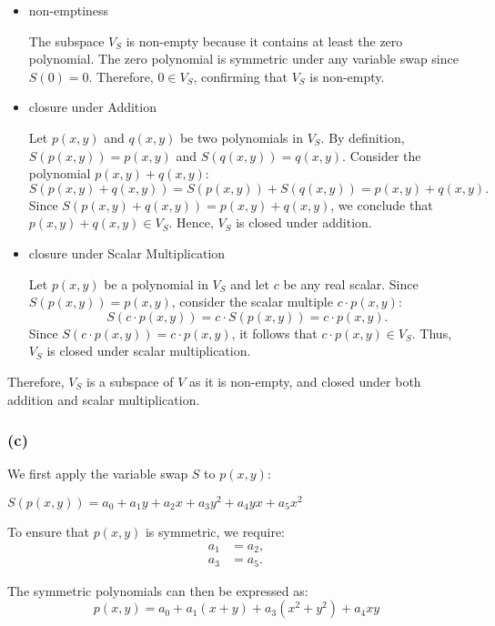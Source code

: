 \documentclass[12pt]{article}
\begin{document}
  \begin{itemize}
    \item non-emptiness

    The subspace \( V_S \) is non-empty because it contains at least the zero polynomial. The zero polynomial is symmetric under any variable swap since \( S(0) = 0 \). Therefore, \( 0 \in V_S \), confirming that \( V_S \) is non-empty.

    \item closure under Addition

    Let \( p(x, y) \) and \( q(x, y) \) be two polynomials in \( V_S \). By definition, \( S(p(x, y)) = p(x, y) \) and \( S(q(x, y)) = q(x, y) \). Consider the polynomial \( p(x, y) + q(x, y) \):
    \[
    S(p(x, y) + q(x, y)) = S(p(x, y)) + S(q(x, y)) = p(x, y) + q(x, y).
    \]
    Since \( S(p(x, y) + q(x, y)) = p(x, y) + q(x, y) \), we conclude that \( p(x, y) + q(x, y) \in V_S \). Hence, \( V_S \) is closed under addition.

    \item closure under Scalar Multiplication

    Let \( p(x, y) \) be a polynomial in \( V_S \) and let \( c \) be any real scalar. Since \( S(p(x, y)) = p(x, y) \), consider the scalar multiple \( c \cdot p(x, y) \):
    \[
    S(c \cdot p(x, y)) = c \cdot S(p(x, y)) = c \cdot p(x, y).
    \]
    Since \( S(c \cdot p(x, y)) = c \cdot p(x, y) \), it follows that \( c \cdot p(x, y) \in V_S \). Thus, \( V_S \) is closed under scalar multiplication.

  \end{itemize}
  Therefore, \( V_S \) is a subspace of \( V \) as it is non-empty, and closed under both addition and scalar multiplication.

  \subsubsection*{(c)}
    We first apply the variable swap \( S \) to \( p(x, y) \):
    \begin{center}
        \( S(p(x, y)) = a_0 + a_1y + a_2x + a_3y^2 + a_4yx + a_5x^2 \)
    \end{center}

    To ensure that \( p(x, y) \) is symmetric, we require:
    \begin{align*}
        a_1 &= a_2, \\
        a_3 &= a_5.
    \end{align*}

    The symmetric polynomials can then be expressed as:
    \[ p(x, y) = a_0 + a_1(x + y) + a_3(x^2 + y^2) + a_4xy \]
\end{document}
